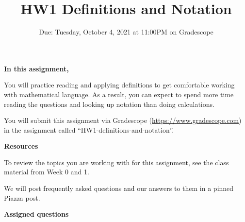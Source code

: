

\title{HW1 Definitions and Notation}
\date{Due: Tuesday, October 4, 2021 at 11:00PM on Gradescope}


\maketitle
\thispagestyle{fancy}


{\bf In this assignment,}

You will practice reading and
applying definitions to get comfortable working with mathematical language. As
a result, you can expect to spend more time reading the questions and looking
up notation than doing calculations.

\instructions

You will submit this assignment via Gradescope
(\href{https://www.gradescope.com}{https://www.gradescope.com}) 
in the assignment called ``HW1-definitions-and-notation''.


{\bf Resources}

To review the topics you are working with for this assignment, see the class material from 
Week 0 and 1.


We will post frequently asked questions and our answers to them in a 
pinned Piazza post.

{\bf Assigned questions}

